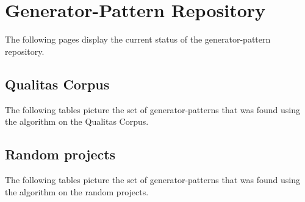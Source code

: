 
\chapter{Generator-Pattern Repository}\label{chapter:generatorPatternRepository}
The following pages display the current status of the generator-pattern repository.

\section{Qualitas Corpus}
The following tables picture the set of generator-patterns that was found using the algorithm on the Qualitas Corpus.




\cleardoublepage{}
\section{Random projects}
The following tables picture the set of generator-patterns that was found using the algorithm on the random projects.

